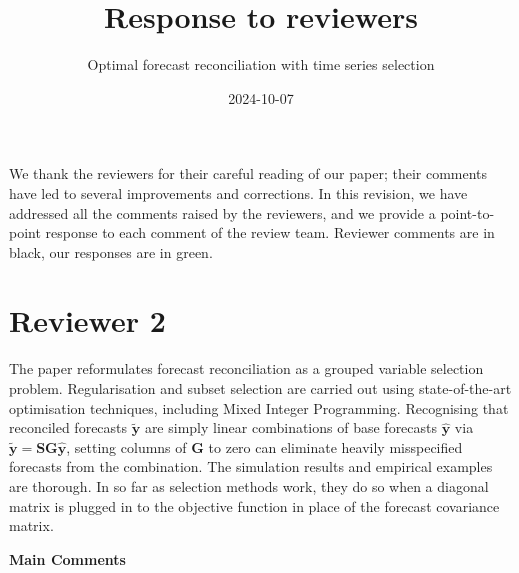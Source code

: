 \documentclass[11pt,a4paper,]{article}
\title{Response to reviewers}
\author{Optimal forecast reconciliation with time series selection}
\date{2024-10-07}
\begin{document}
\vspace*{-2cm}
\begin{snugshade}\sffamily
\maketitle
\end{snugshade}\vspace*{0.5cm}


We thank the reviewers for their careful reading of our paper; their
comments have led to several improvements and corrections. In this
revision, we have addressed all the comments raised by the reviewers,
and we provide a point-to-point response to each comment of the review
team. Reviewer comments are in black, our responses are in green.

\section*{Reviewer 2}\label{reviewer-2}

The paper reformulates forecast reconciliation as a grouped variable
selection problem. Regularisation and subset selection are carried out
using state-of-the-art optimisation techniques, including Mixed Integer
Programming. Recognising that reconciled forecasts \(\tilde{\bm{y}}\)
are simply linear combinations of base forecasts \(\hat{\bm{y}}\) via
\(\tilde{\bm{y}}=\bm{SG}\hat{\bm{y}}\), setting columns of \(\bm{G}\) to
zero can eliminate heavily misspecified forecasts from the combination.
The simulation results and empirical examples are thorough. In so far as
selection methods work, they do so when a diagonal matrix is plugged in
to the objective function in place of the forecast covariance matrix.

\textbf{Main Comments}
\end{document}
